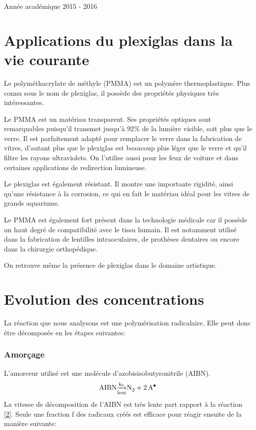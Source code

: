 \documentclass[a4paper,oneside,12pt]{article}
\begin{document}
\begin{titlepage}
	\vspace{0.4cm}
	
	{\normalsize Année académique 2015 - 2016}\\
	
\end{titlepage}

\part{Applications du plexiglas dans la vie courante}

Le polyméthacrylate de méthyle (PMMA) est un polymère thermoplastique. Plus connu sous le nom de plexiglas, il possède des propriétés physiques très intéressantes.

Le PMMA est un matériau transparent. Ses propriétés optiques sont remarquables puisqu'il transmet jusqu'à $92\%$ de la lumière visible, soit plus que le verre. Il est parfaitement adapté pour remplacer le verre dans la fabrication de vitres, d'autant plus que le plexiglas est beaucoup plus léger que le verre et qu'il filtre les rayons ultraviolets. On l'utilise aussi pour les feux de voiture et dans certaines applications de redirection lumineuse.

Le plexiglas est également résistant. Il montre une importante rigidité, ainsi qu'une résistance à la corrosion, ce qui en fait le matériau idéal pour les vitres de grands aquariums.

Le PMMA est également fort présent dans la technologie médicale car il possède un haut degré de compatibilité avec le tissu humain.
Il est notamment utilisé dans la fabrication de lentilles intraoculaires, de prothèses dentaires ou encore dans la chirurgie orthopédique. 

On retrouve même la présence de plexiglas dans le domaine artistique.

\part{Evolution des concentrations}
La réaction que nous analysons est une polymérisation radicalaire. Elle peut donc être décomposée en les étapes suivantes:
\section{Amorçage}
L'amorceur utilisé est une molécule d'azobisisobutyronitrile (AIBN). 
\begin{equation}
	\ce{AIBN \underset{lent}{\xrightarrow{k_0}} N2 + 2A^{\bullet}}
\end{equation}	
La vitesse de décomposition de l'AIBN est très lente part rapport à la réaction \ref{2}. Seule une fraction f des radicaux créés est efficace pour réagir ensuite de la manière suivante:
\end{document}
